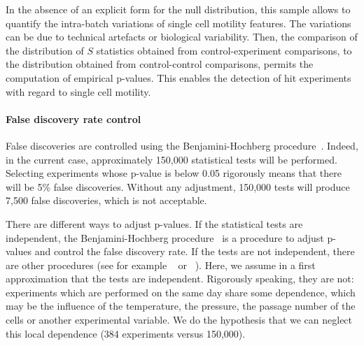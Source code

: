 In the absence of an explicit form for the null distribution, this sample allows to quantify the intra-batch variations of single cell motility features. The variations can be due to technical artefacts or biological variability. Then, the comparison of the distribution of $S$ statistics obtained from control-experiment comparisons, to the distribution obtained from control-control comparisons, permits the computation of empirical p-values. This enables the detection of hit experiments with regard to single cell motility.  

\paragraph{False discovery rate control\\}
\label{sec:fdr}
False discoveries are controlled using the Benjamini-Hochberg procedure~\cite{Benjamini1}. Indeed, in the current case, approximately 150,000 statistical tests will be performed. Selecting experiments whose p-value is below 0.05 rigorously means that there will be 5\% false discoveries. Without any adjustment, 150,000 tests will produce 7,500 false discoveries, which is not acceptable. 

There are different ways to adjust p-values. If the statistical tests are independent, the Benjamini-Hochberg procedure~\cite{Benjamini1} is a procedure to adjust p-values and control the false discovery rate. If the tests are not independent, there are other procedures (see for example ~\cite{Benjamini2} or ~\cite{Roquain}). Here, we assume in a first approximation that the tests are independent. Rigorously speaking, they are not: experiments which are performed on the same day share some dependence, which may be the influence of the temperature, the pressure, the passage number of the cells or another experimental variable. We do the hypothesis that we can neglect this local dependence (384 experiments versus 150,000).


